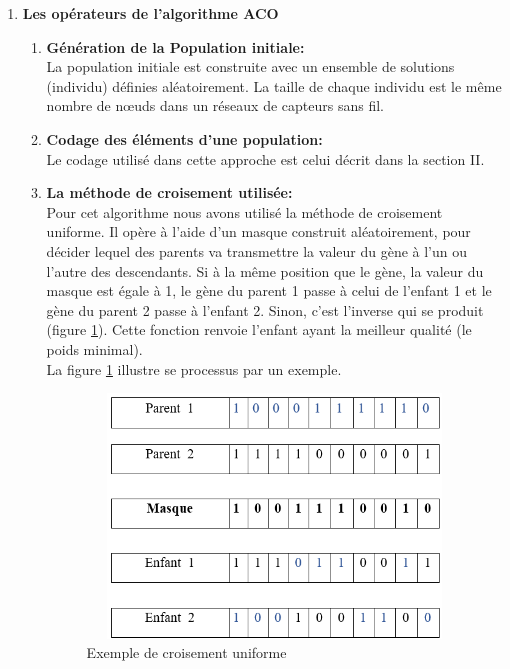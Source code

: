 \begin{enumerate}
	\item \textbf{Les opérateurs de l’algorithme ACO}\\

\begin{enumerate}[label=\alph*)]
	\item \textbf{Génération de la Population initiale:}\\
	La population initiale est construite avec un ensemble de solutions (individu) définies aléatoirement. La taille de chaque individu est le même nombre de nœuds dans un réseaux de capteurs sans fil.


	\item \textbf{Codage des éléments d’une population: }\\
	Le codage utilisé dans cette approche est celui décrit dans la section II.
	
	\item \textbf{La méthode de croisement utilisée:}\\
	Pour cet algorithme nous avons utilisé la méthode de croisement uniforme. Il opère à l’aide d’un masque construit aléatoirement, pour décider lequel des parents va transmettre  la valeur du gène à l’un ou l’autre des descendants. Si à la même position que le gène, la valeur du masque est égale à 1, le gène du parent 1 passe à celui de l’enfant 1 et le gène du parent 2 passe à l’enfant 2. Sinon, c’est l’inverse qui se produit (figure \ref{fig:ECU}). Cette fonction renvoie l’enfant ayant la meilleur qualité (le poids minimal).\\
La figure \ref{fig:ECU} illustre se processus par un exemple.

\begin{figure}[H]
	\centering
	\includegraphics[width=12cm,height=6.5cm]{Chap4/1.png}
	\caption{Exemple de croisement uniforme}
	\label{fig:ECU}
\end{figure}
	


\end{enumerate}
\end{enumerate}
